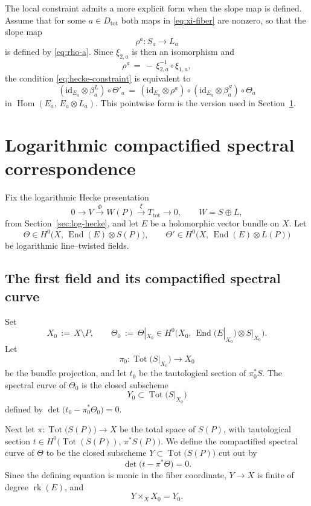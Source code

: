 \documentclass[a4paper,12pt]{amsart}
\numberwithin{equation}{section}
\theoremstyle{definition}
\newcommand{\End}{\operatorname{End}}
\newcommand{\Hom}{\operatorname{Hom}}
\newcommand{\Tot}{\operatorname{Tot}}
\newcommand{\id}{\mathrm{id}}
\newcommand{\rk}{\operatorname{rk}}
\begin{document}
The local constraint admits a more explicit form when the slope map is defined. Assume that for some \(a\in D_{\mathrm{tot}}\) both maps in \eqref{eq:xi-fiber} are nonzero, so that the slope map
\[
\rho^a:S_a\longrightarrow L_a
\]
is defined by \eqref{eq:rho-a}.  Since \(\xi_{2,a}\) is then an isomorphism and
\[
\rho^a\,=\,-\,\xi_{2,a}^{-1}\circ \xi_{1,a},
\]
the condition \eqref{eq:hecke-constraint} is equivalent to
\begin{equation}\label{eq:explicit-constraint}
(\id_{E_a}\otimes \beta_a^L)\circ \Theta'_a
\,=\,
(\id_{E_a}\otimes \rho^a)\circ (\id_{E_a}\otimes \beta_a^S)\circ \Theta_a
\end{equation}
in \(\Hom(E_a,\,E_a\otimes L_a)\).  This pointwise form is the version used in Section~\ref{sec:spectral}.

\section{Logarithmic compactified spectral correspondence}\label{sec:spectral}

Fix the logarithmic Hecke presentation
\[
0\longrightarrow V \xrightarrow{\ \Phi\ } W(P)\xrightarrow{\ \xi\ } T_{\mathrm{tot}}\longrightarrow 0,
\qquad W=S\oplus L,
\]
from Section~\ref{sec:log-hecke}, and let \(E\) be a holomorphic vector bundle on \(X\).
Let
\[
\Theta\in H^0\bigl(X,\, \End(E)\otimes S(P)\bigr),
\qquad
\Theta'\in H^0\bigl(X,\, \End(E)\otimes L(P)\bigr)
\]
be logarithmic line--twisted fields. 

\subsection{The first field and its compactified spectral curve}

Set
\[
X_0\,:=\,X\setminus P,
\qquad
\Theta_0\,:=\,\Theta|_{X_0}\in H^0\bigl(X_0,\, \End(E|_{X_0})\otimes S|_{X_0}\bigr).
\]
Let
\[
\pi_0:\Tot\bigl(S|_{X_0}\bigr)\longrightarrow X_0
\]
be the bundle projection, and let \(t_0\) be the tautological section of \(\pi_0^*S\).  The spectral curve of \(\Theta_0\) is the closed subscheme
\[
Y_0\subset \Tot\bigl(S|_{X_0}\bigr)
\]
defined by
\(\det\bigl(t_0-\pi_0^*\Theta_0\bigr)=0.\)

Next let
\(
\pi:\Tot\bigl(S(P)\bigr)\longrightarrow X
\)
be the total space of \(S(P)\), with tautological section
\(
t\in H^0\bigl(\Tot(S(P)),\,\pi^*S(P)\bigr).
\)
We define the compactified spectral curve of \(\Theta\) to be the closed subscheme
\(
Y\subset \Tot\bigl(S(P)\bigr)
\)
cut out by
\begin{equation}\label{eq:spectral-compact}
\det\bigl(t-\pi^*\Theta\bigr)=0.
\end{equation}
Since the defining equation is monic in the fiber coordinate, \(Y\longrightarrow X\) is finite of degree \(\rk(E)\), and
\[
Y\times_X X_0=Y_0.
\]
\end{document}
